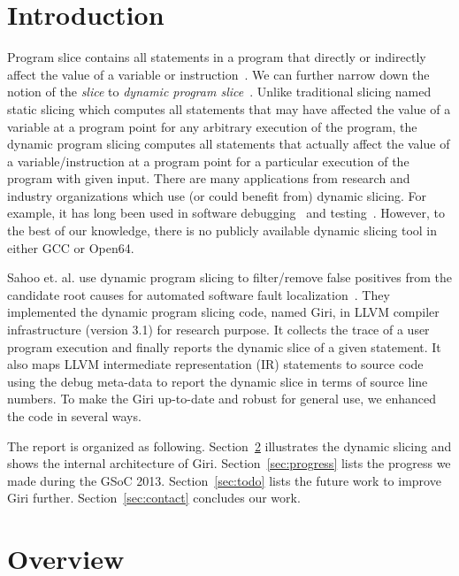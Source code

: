 \documentclass[DIV=calc, paper=a4, fontsize=11pt, twocolumn]{scrartcl}
\begin{document}
\section{Introduction}
Program slice contains all statements in a program that directly or indirectly affect the value of a variable or instruction~\cite{weiser}.
We can further narrow down the notion of the \emph{slice} to \emph{dynamic program slice}~\cite{agrawal1990dynamic}.
Unlike traditional slicing named static slicing which computes all statements that may have affected the value of a variable at a program point for any arbitrary execution of the program,
the dynamic program slicing computes all statements that actually affect the value of a variable/instruction at a program point for a particular execution of the program with given input.
There are many applications from research and industry organizations which use (or could benefit from) dynamic slicing.
For example, it has long been used in software debugging~\cite{1993debugging,1999efficient} and testing~\cite{1993incremental}.
However, to the best of our knowledge, there is no publicly available dynamic slicing tool in either GCC or Open64.

Sahoo et. al. use dynamic program slicing to filter/remove false positives from the candidate root causes for automated software fault localization~\cite{sahoo2013asplos}.
They implemented the dynamic program slicing code, named Giri, in LLVM compiler infrastructure (version 3.1) for research purpose.
It collects the trace of a user program execution and finally reports the dynamic slice of a given statement.
It also maps LLVM intermediate representation (IR) statements to source code using the debug meta-data to report the dynamic slice in terms of source line numbers.
To make the Giri up-to-date and robust for general use, we enhanced the code in several ways.

The report is organized as following.
Section~\ref{sec:overview} illustrates the dynamic slicing and shows the internal architecture of Giri.
Section~\ref{sec:progress} lists the progress we made during the GSoC 2013.
Section~\ref{sec:todo} lists the future work to improve Giri further.
Section~\ref{sec:contact} concludes our work.

\section{Overview}
\label{sec:overview}
\end{document}
